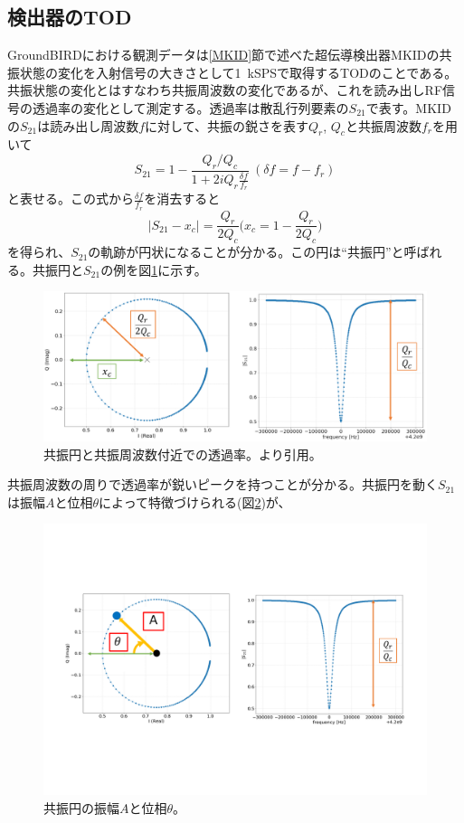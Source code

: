 \subsection{検出器のTOD}
GroundBIRDにおける観測データは\ref{MKID}節で述べた超伝導検出器MKIDの共振状態の変化を入射信号の大きさとして\SI{1}{kSPS}で取得するTODのことである。共振状態の変化とはすなわち共振周波数の変化であるが、これを読み出しRF信号の透過率の変化として測定する。透過率は散乱行列要素の$S_{21}$で表す。MKIDの$S_{21}$は読み出し周波数$f$に対して、共振の鋭さを表す$Q_{r}$, $Q_{c}$と共振周波数$f_{r}$を用いて
\begin{equation}
  S_{21} = 1 - \frac{Q_{r}/Q_{c}}{1+2iQ_{r}\frac{\delta f}{f_{r}}} ~ (\delta f = f - f_{r} )
\end{equation}
と表せる。この式から$\frac{\delta f}{f_{r}}$を消去すると
\begin{equation}
  |S_{21}-x_{c}| = \frac{Q_{r}}{2Q_{c}} \biggl(x_{c} = 1-\frac{Q_{r}}{2Q_{c}}\biggr)
\end{equation}
を得られ\cite{muto}、$S_{21}$の軌跡が円状になることが分かる。この円は``共振円''と呼ばれる。共振円と$S_{21}$の例を図\ref{res_circ}に示す。
\begin{figure}[htbp]
  \centering
  \includegraphics[width=1.0\columnwidth]{5_alignment/figs/iq_amp.pdf}
  \caption{共振円と共振周波数付近での透過率。\cite{sueno_master}より引用。}
  \label{res_circ}
\end{figure}
共振周波数の周りで透過率が鋭いピークを持つことが分かる。共振円を動く$S_{21}$は振幅$A$と位相$\theta$によって特徴づけられる(図\ref{phase_amp})が、
\begin{figure}[htbp]
  \centering
  \includegraphics[width=0.6\columnwidth]{5_alignment/figs/phase_amp.pdf}
  \caption{共振円の振幅$A$と位相$\theta$。}
  \label{phase_amp}
\end{figure}
